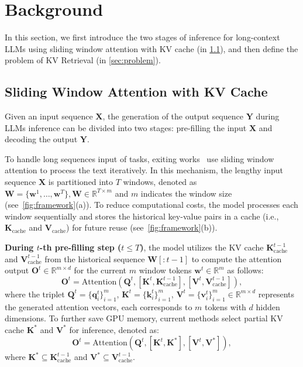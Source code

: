 
\section{Background}
In this section, we first introduce the two stages of inference for long-context LLMs using sliding window attention with KV cache (in \cref{sec:window}), and then define the problem of KV Retrieval (in \cref{sec:problem}).

\subsection{Sliding Window Attention with KV Cache}
\label{sec:window}
Given an input sequence $\mathbf{X}$, the generation of the output sequence $\mathbf{Y}$ during LLMs inference can be divided into two stages: pre-filling the input $\mathbf{X}$ and decoding the output $\mathbf{Y}$.

To handle long sequences input of tasks, exiting works~\cite{stream-llm, infllm, qllm} use sliding window attention to process the text iteratively. In this mechanism, the lengthy input sequence $\mathbf{X}$ is partitioned into $T$ windows, denoted as $\mathbf{W} = \{ \mathbf{w}^{1}, \dots, \mathbf{w}^{T}\}, \mathbf{W}\in \mathbb{R}^{T \times m}$ and $m$ indicates the window size (see~\cref{fig:framework}(a)). To reduce computational costs, the model processes each window sequentially  and stores the historical key-value pairs in a cache (i.e., $\mathbf{K}_{\text{cache}}$ and $\mathbf{V}_{\text{cache}}$) for future reuse (see~\cref{fig:framework}(b)).

\textbf{During $t$-th pre-filling step  ($t \leq T$)}, the model utilizes the KV cache $\mathbf{K}^{t-1}_{\text{cache}}$ and $\mathbf{V}^{t-1}_{\text{cache}}$ from the historical sequence $\mathbf{W}[:t-1]$ to compute the attention output $\mathbf{O}^{t} \in \mathbb{R}^{m \times d}$ for the current $m$ window tokens $\mathbf{w}^{t} \in \mathbb{R}^{m}$ as follows:
\begin{equation}
\mathbf{O}^{t} = \text{Attention}\left( \mathbf{Q}^{t}, \left[ \mathbf{K}^{t}, \mathbf{K}^{t-1}_{\text{cache}} \right], \left[ \mathbf{V}^{t}, \mathbf{V}^{t-1}_{\text{cache}} \right] \right),
\label{eq:prefilling}
\end{equation}
where the triplet $\mathbf{Q}^{t}=\{\mathbf{q}^{t}_i\}^m_{i=1}$, $\mathbf{K}^{t}=\{\mathbf{k}^{t}_i\}^m_{i=1}$, $\mathbf{V}^{t}=\{\mathbf{v}^{t}_i\}^m_{i=1} \in \mathbb{R}^{m \times d}$ represents the generated attention vectors, each corresponds to $m$ tokens with $d$ hidden dimensions. To further save GPU memory, current methods select partial KV cache $\mathbf{K}^{*}$ and $\mathbf{V}^{*}$ for inference, denoted as:
\begin{equation}
\mathbf{O}^{t} = \text{Attention}\left( \mathbf{Q}^{t}, \left[ \mathbf{K}^{t}, \mathbf{K}^{*} \right], \left[ \mathbf{V}^{t}, \mathbf{V}^{*} \right] \right),
\label{eq:prefilling}
\end{equation}
where $\mathbf{K}^{*} \subseteq \mathbf{K}^{t-1}_{\text{cache}}$ and $\mathbf{V}^{*} \subseteq \mathbf{V}^{t-1}_{\text{cache}}$. 

